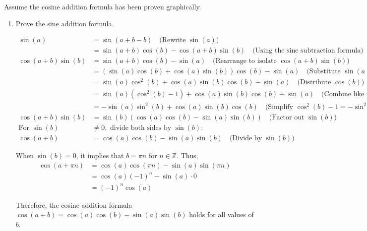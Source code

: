 \documentclass{article}
\begin{document}
Assume the cosine addition formula has been proven graphically.

\begin{enumerate}
    \item[a)] Prove the sine addition formula.
    \begin{solution}
        \begin{align*}
            \sin(a) &= \sin(a + b - b) \quad \text{(Rewrite \(\sin(a)\))} \\
            &= \sin(a + b)\cos(b) - \cos(a + b)\sin(b) \quad \text{(Using the sine subtraction formula)} \\
            \cos(a + b)\sin(b) &= \sin(a + b)\cos(b) - \sin(a) \quad \text{(Rearrange to isolate \(\cos(a + b)\sin(b)\))} \\
            &= (\sin(a)\cos(b) + \cos(a)\sin(b))\cos(b) - \sin(a) \quad \text{(Substitute \(\sin(a + b)\) using the sine addition formula)} \\
            &= \sin(a)\cos^2(b) + \cos(a)\sin(b)\cos(b) - \sin(a) \quad \text{(Distribute \(\cos(b)\))} \\
            &= \sin(a)(\cos^2(b) - 1) + \cos(a)\sin(b)\cos(b) + \sin(a) \quad \text{(Combine like terms)} \\
            &= -\sin(a)\sin^2(b) + \cos(a)\sin(b)\cos(b) \quad \text{(Simplify \(\cos^2(b) - 1 = -\sin^2(b)\))} \\
            \cos(a + b)\sin(b) &= \sin(b)(\cos(a)\cos(b) - \sin(a)\sin(b)) \quad \text{(Factor out \(\sin(b)\))} \\
            \text{For } \sin(b) &\neq 0, \text{ divide both sides by } \sin(b): \\
            \cos(a + b) &= \cos(a)\cos(b) - \sin(a)\sin(b) \quad \text{(Divide by \(\sin(b)\))}
        \end{align*}

        When \(\sin(b) = 0\), it implies that \(b = \pi n\) for \(n \in \mathbb{Z}\). Thus,
        \begin{align*}
            \cos(a + \pi n) &= \cos(a) \cos(\pi n) - \sin(a) \sin(\pi n) \\
            &= \cos(a)(-1)^n - \sin(a) \cdot 0 \\
            &= (-1)^n \cos(a)
        \end{align*}

        Therefore, the cosine addition formula \(\cos(a + b) = \cos(a) \cos(b) - \sin(a) \sin(b)\) holds for all values of \(b\).


\end{solution}
\end{enumerate}
\end{document}

